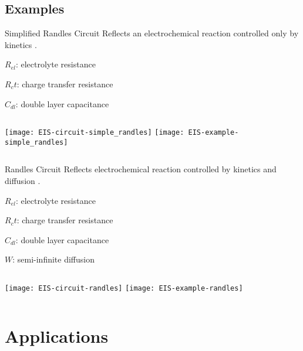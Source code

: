 \documentclass[10pt,compress,handout]{beamer}
\begin{document}
    \subsection{Examples}
    \begin{frame}{Simplified Randles Circuit}
        Reflects an electrochemical reaction controlled only by kinetics \citep{lazanas2023}.

        $R_{el}$: electrolyte resistance

        $R_ct$: charge transfer resistance

        $C_{dl}$: double layer capacitance

        \begin{columns}
                \texttt{[image: EIS-circuit-simple\_randles]}
                \texttt{[image: EIS-example-simple\_randles]}
        \end{columns}
    \end{frame}

    \begin{frame}{Randles Circuit}
        Reflects electrochemical reaction controlled by kinetics and diffusion \citep{lazanas2023}.

        $R_{el}$: electrolyte resistance

        $R_ct$: charge transfer resistance

        $C_{dl}$: double layer capacitance

        $W$: semi-infinite diffusion
        \begin{columns}
                \texttt{[image: EIS-circuit-randles]}
                \texttt{[image: EIS-example-randles]}
        \end{columns}
        
    \end{frame}

\section{Applications}
\end{document}

